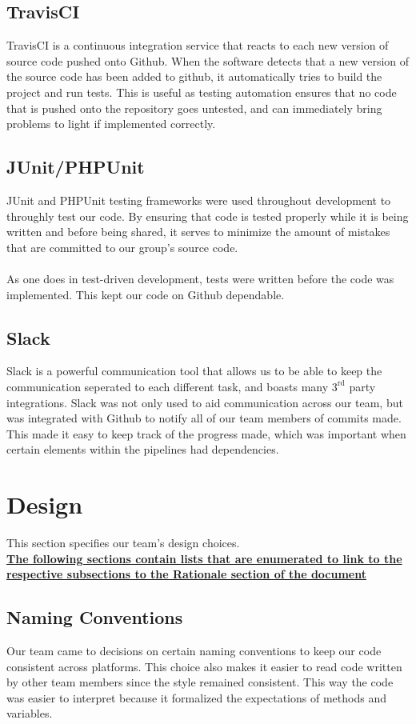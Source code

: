 \documentclass[12pt]{report}
\begin{document}
\subsection{TravisCI}
TravisCI is a continuous integration service that reacts to each new version of source code pushed onto Github. When the software detects that a new version of the source code has been added to github, it automatically tries to build the project and run tests. This is useful as testing automation ensures that no code that is pushed onto the repository goes untested, and can immediately bring problems to light if implemented correctly.

\subsection{JUnit/PHPUnit}
JUnit and PHPUnit testing frameworks were used throughout development to throughly test our code. By ensuring that code is tested properly while it is being written and before being shared, it serves to minimize the amount of mistakes that are committed to our group's source code.\\\\
As one does in test-driven development, tests were written before the code was implemented. This kept our code on Github dependable.

\subsection{Slack}
Slack is a powerful communication tool that allows us to be able to keep the communication seperated to each different task, and boasts many $3^{\text{rd}}$ party integrations. Slack was not only used to aid communication across our team, but was integrated with Github to notify all of our team members of commits made. This made it easy to keep track of the progress made, which was important when certain elements within the pipelines had dependencies.
\section{Design}
\label{s:integration-design}
This section specifies our team's design choices.\\

\textbf{ \hyperref[s:integration-rationale]{The following sections contain lists that are enumerated to link to the respective subsections to the Rationale section of the document}}

\subsection{Naming Conventions}
Our team came to decisions on certain naming conventions to keep our code consistent across platforms. This choice also makes it easier to read code written by other team members since the style remained consistent. This way the code was easier to interpret because it formalized the expectations of methods and variables. \\
\end{document}
